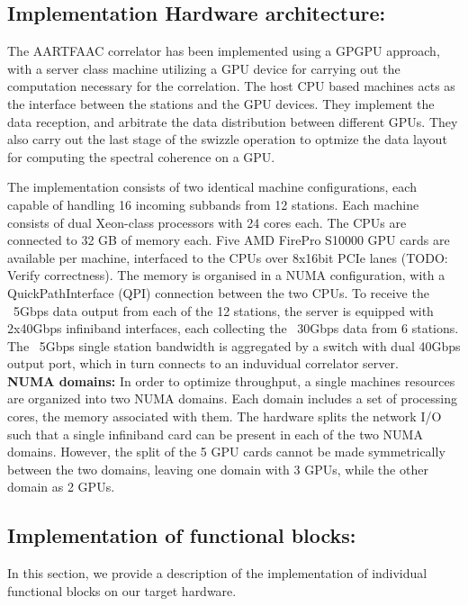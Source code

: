 \documentclass{aa}
\begin{document}
\subsection  {Implementation  Hardware  architecture:} 
The AARTFAAC  correlator has  been implemented  using a  GPGPU approach,  with a
server class  machine utilizing a  GPU device  for carrying out  the computation
necessary  for  the correlation.   The  host  CPU  based  machines acts  as  the
interface between  the stations  and the  GPU devices.  They implement  the data
reception, and arbitrate the data distribution between different GPUs. They also
carry out the last stage of the swizzle operation to optmize the data layout for
computing the spectral coherence on a GPU.

The  implementation  consists  of  two identical  machine  configurations,  each
capable of handling 16 incoming subbands from 12 stations. Each machine consists
of dual Xeon-class processors  with 24 cores each. The CPUs  are connected to 32
GB of memory each. Five AMD FirePro  S10000 GPU cards are available per machine,
interfaced to the CPUs over 8x16bit  PCIe lanes (TODO: Verify correctness).  The
memory is  organised in  a NUMA configuration,  with a  QuickPathInterface (QPI)
connection between the two CPUs. To receive  the ~5Gbps data output from each of
the 12  stations, the  server is equipped  with 2x40Gbps  infiniband interfaces,
each collecting  the ~30Gbps data  from 6  stations.  The ~5Gbps  single station
bandwidth is aggregated by a switch with  dual 40Gbps output port, which in turn
connects to an induvidual correlator server.\\

\textbf  {NUMA domains:}  In order  to  optimize throughput,  a single  machines
resources are  organized into two  NUMA domains. Each  domain includes a  set of
processing  cores, the  memory associated  with  them. The  hardware splits  the
network I/O such that a single infiniband card can be present in each of the two
NUMA domains. However, the split of the 5 GPU cards cannot be made symmetrically
between the two domains, leaving one domain  with 3 GPUs, while the other domain
as 2 GPUs.

\subsection {Implementation of functional  blocks:} 

In this  section, we provide a  description of the implementation  of individual
functional blocks on our target hardware.
\end{document}
